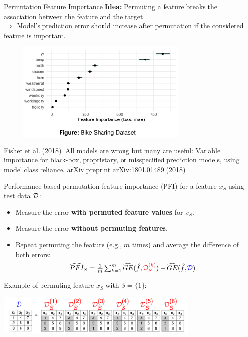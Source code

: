 \documentclass[11pt,compress,t,notes=noshow, xcolor=table]{beamer}
\begin{document}
\begin{vbframe}{Permutation Feature Importance}
\textbf{Idea:} Permuting a feature breaks the association between the feature and the target.\\
$\Rightarrow$ Model's prediction error should increase after permutation if the considered feature is important.

\begin{figure}
  \includegraphics[width=0.75\textwidth]{figure_man/feature-importance.png}
\end{figure}

\vspace{-0.2cm}
\tiny{Fisher et al. (2018). All models are wrong but many are useful: Variable importance for black-box, proprietary, or misspecified prediction models, using model class reliance. arXiv preprint arXiv:1801.01489 (2018).}

\framebreak
\normalsize

Performance-based permutation feature importance (PFI) for a feature $x_S$ using test data $\D$:
\begin{itemize}
  \item Measure the error \color{red}\textbf{with permuted feature values} \color{black} for $x_S$.
  \item Measure the error \color{blue}\textbf{without permuting features}\color{black}.
  \item Repeat permuting the feature (e.g., $m$ times) and average the difference of both errors: 
$$\widehat{PFI}_S = \tfrac{1}{m} \textstyle\sum\nolimits_{k = 1}^{m} \widehat{GE}(\fh, {\color{red}\D_{S}^{(k)}}) - \widehat{GE}(\fh, {\color{blue}\D})$$
\end{itemize}

Example of permuting feature $x_S$ with $S = \{1\}$:

\begin{center}
\includegraphics[width=0.75\textwidth]{figure_man/permuted-fv.png}
\end{center}


\end{vbframe}
\end{document}

